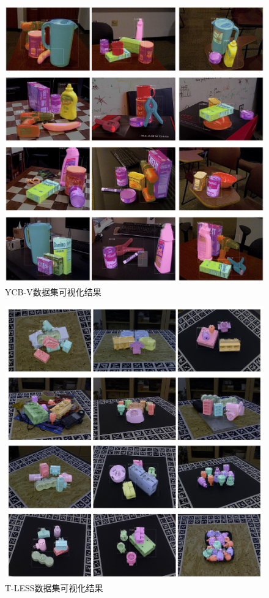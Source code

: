 \begin{figure}
    \centering
    \includegraphics[width=1\linewidth]{figure/hipose/ycbv_visulize.pdf}
    \caption{YCB-V数据集可视化结果}
    \label{fig:Qualitative_YCBV}
\end{figure}

\begin{figure}
    \centering
    \includegraphics[width=1\linewidth]{figure/hipose/tless_visulize.pdf}
    \caption{T-LESS数据集可视化结果}
    \label{fig:Qualitative_TLESS}
\end{figure}

